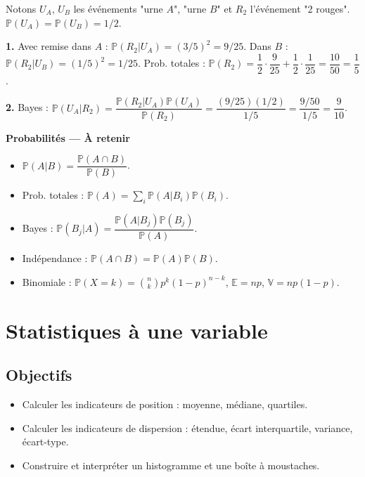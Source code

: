 \documentclass[11pt,a4paper,twoside]{book}
\begin{document}
\begin{correctionbox}[Correction]
Notons $U_A$, $U_B$ les événements "urne $A$", "urne $B$" et $R_2$ l'événement "2 rouges".
$\mathbb{P}(U_A)=\mathbb{P}(U_B)=1/2$.

\textbf{1.} Avec remise dans $A$ : $\mathbb{P}(R_2|U_A)=(3/5)^2=9/25$.
Dans $B$ : $\mathbb{P}(R_2|U_B)=(1/5)^2=1/25$.
Prob. totales : $\mathbb{P}(R_2)=\dfrac{1}{2}\cdot\dfrac{9}{25}+\dfrac{1}{2}\cdot\dfrac{1}{25}=\dfrac{10}{50}=\dfrac{1}{5}$.

\textbf{2.} Bayes : $\mathbb{P}(U_A|R_2)=\dfrac{\mathbb{P}(R_2|U_A)\mathbb{P}(U_A)}{\mathbb{P}(R_2)}=\dfrac{(9/25)(1/2)}{1/5}=\dfrac{9/50}{1/5}=\dfrac{9}{10}$.
\end{correctionbox}

\begin{retenirbox}
\textbf{Probabilités — À retenir}
\begin{itemize}
  \item $\mathbb{P}(A|B)=\dfrac{\mathbb{P}(A\cap B)}{\mathbb{P}(B)}$.
  \item Prob. totales : $\mathbb{P}(A)=\sum_i\mathbb{P}(A|B_i)\mathbb{P}(B_i)$.
  \item Bayes : $\mathbb{P}(B_j|A)=\dfrac{\mathbb{P}(A|B_j)\mathbb{P}(B_j)}{\mathbb{P}(A)}$.
  \item Indépendance : $\mathbb{P}(A\cap B)=\mathbb{P}(A)\mathbb{P}(B)$.
  \item Binomiale : $\mathbb{P}(X=k)=\binom{n}{k}p^k(1-p)^{n-k}$, $\mathbb{E}=np$, $\mathbb{V}=np(1-p)$.
\end{itemize}
\end{retenirbox}

\chapter{Statistiques à une variable}

\section*{Objectifs}
\begin{itemize}[leftmargin=1.5em]
  \item Calculer les indicateurs de position : moyenne, médiane, quartiles.
  \item Calculer les indicateurs de dispersion : étendue, écart interquartile, variance, écart-type.
  \item Construire et interpréter un histogramme et une boîte à moustaches.
\end{itemize}
\end{document}
